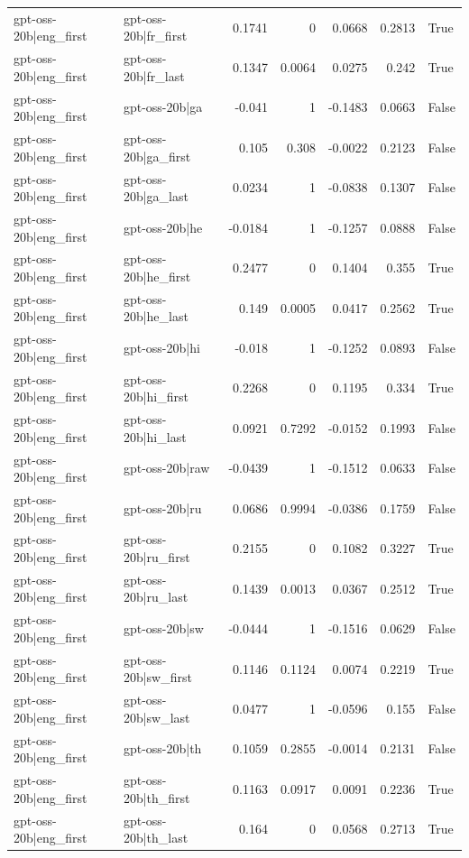 \begin{table}
\begin{tabular}{l l r r r r l}
gpt-oss-20b|eng_first & gpt-oss-20b|fr_first & 0.1741 & 0 & 0.0668 & 0.2813 & True \\
gpt-oss-20b|eng_first & gpt-oss-20b|fr_last & 0.1347 & 0.0064 & 0.0275 & 0.242 & True \\
gpt-oss-20b|eng_first & gpt-oss-20b|ga & -0.041 & 1 & -0.1483 & 0.0663 & False \\
gpt-oss-20b|eng_first & gpt-oss-20b|ga_first & 0.105 & 0.308 & -0.0022 & 0.2123 & False \\
gpt-oss-20b|eng_first & gpt-oss-20b|ga_last & 0.0234 & 1 & -0.0838 & 0.1307 & False \\
gpt-oss-20b|eng_first & gpt-oss-20b|he & -0.0184 & 1 & -0.1257 & 0.0888 & False \\
gpt-oss-20b|eng_first & gpt-oss-20b|he_first & 0.2477 & 0 & 0.1404 & 0.355 & True \\
gpt-oss-20b|eng_first & gpt-oss-20b|he_last & 0.149 & 0.0005 & 0.0417 & 0.2562 & True \\
gpt-oss-20b|eng_first & gpt-oss-20b|hi & -0.018 & 1 & -0.1252 & 0.0893 & False \\
gpt-oss-20b|eng_first & gpt-oss-20b|hi_first & 0.2268 & 0 & 0.1195 & 0.334 & True \\
gpt-oss-20b|eng_first & gpt-oss-20b|hi_last & 0.0921 & 0.7292 & -0.0152 & 0.1993 & False \\
gpt-oss-20b|eng_first & gpt-oss-20b|raw & -0.0439 & 1 & -0.1512 & 0.0633 & False \\
gpt-oss-20b|eng_first & gpt-oss-20b|ru & 0.0686 & 0.9994 & -0.0386 & 0.1759 & False \\
gpt-oss-20b|eng_first & gpt-oss-20b|ru_first & 0.2155 & 0 & 0.1082 & 0.3227 & True \\
gpt-oss-20b|eng_first & gpt-oss-20b|ru_last & 0.1439 & 0.0013 & 0.0367 & 0.2512 & True \\
gpt-oss-20b|eng_first & gpt-oss-20b|sw & -0.0444 & 1 & -0.1516 & 0.0629 & False \\
gpt-oss-20b|eng_first & gpt-oss-20b|sw_first & 0.1146 & 0.1124 & 0.0074 & 0.2219 & True \\
gpt-oss-20b|eng_first & gpt-oss-20b|sw_last & 0.0477 & 1 & -0.0596 & 0.155 & False \\
gpt-oss-20b|eng_first & gpt-oss-20b|th & 0.1059 & 0.2855 & -0.0014 & 0.2131 & False \\
gpt-oss-20b|eng_first & gpt-oss-20b|th_first & 0.1163 & 0.0917 & 0.0091 & 0.2236 & True \\
gpt-oss-20b|eng_first & gpt-oss-20b|th_last & 0.164 & 0 & 0.0568 & 0.2713 & True \\

\end{tabular}
\end{table}
